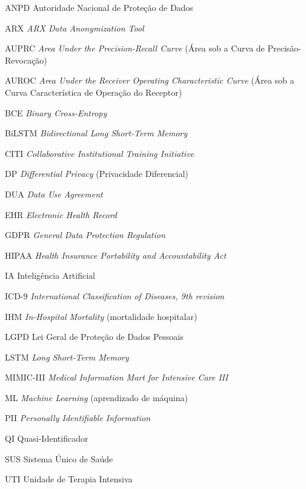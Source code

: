 \begin{siglas}
  \item[ANPD] Autoridade Nacional de Proteção de Dados
  \item[ARX] \textit{ARX Data Anonymization Tool}
  \item[AUPRC] \textit{Area Under the Precision-Recall Curve} (Área sob a Curva de Precisão-Revocação)
  \item[AUROC] \textit{Area Under the Receiver Operating Characteristic Curve} (Área sob a Curva Característica de Operação do Receptor)
  \item[BCE] \textit{Binary Cross-Entropy}
  \item[BiLSTM] \textit{Bidirectional Long Short-Term Memory}
  \item[CITI] \textit{Collaborative Institutional Training Initiative}
  \item[DP] \textit{Differential Privacy} (Privacidade Diferencial)
  \item[DUA] \textit{Data Use Agreement}
  \item[EHR] \textit{Electronic Health Record}
  \item[GDPR] \textit{General Data Protection Regulation}
  \item[HIPAA] \textit{Health Insurance Portability and Accountability Act}
  \item[IA] Inteligência Artificial
  \item[ICD-9] \textit{International Classification of Diseases, 9th revision}
  \item[IHM] \textit{In-Hospital Mortality} (mortalidade hospitalar)
  \item[LGPD] Lei Geral de Proteção de Dados Pessoais
  \item[LSTM] \textit{Long Short-Term Memory}
  \item[MIMIC-III] \textit{Medical Information Mart for Intensive Care III}
  \item[ML] \textit{Machine Learning} (aprendizado de máquina)
  \item[PII] \textit{Personally Identifiable Information}
  \item[QI] Quasi-Identificador
  \item[SUS] Sistema Único de Saúde
  \item[UTI] Unidade de Terapia Intensiva
\end{siglas}
